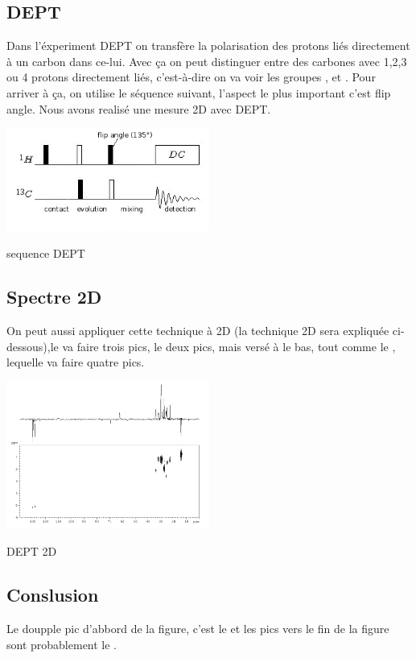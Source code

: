 \documentclass[a4paper,12pt]{scrartcl}
\begin{document}
  \subsection{DEPT }
Dans l'éxperiment DEPT on transfère la polarisation des protons liés directement à un carbon dans ce-lui. Avec \c ca on peut distinguer entre des carbones avec 1,2,3 ou 4 protons directement liés, c'est-à-dire on va voir les groupes ,  et . Pour arriver à \c ca, on utilise le séquence suivant, l'aspect le plus important c'est flip angle.  Nous avons realisé une mesure 2D avec DEPT.
\begin{figurehere}
    \center
    \includegraphics[width=0.5\textwidth]{bilder/DEPT.png}
    \caption{sequence DEPT}
   \end{figurehere}  


  \subsection{Spectre 2D}
   On peut aussi appliquer cette technique à 2D (la technique 2D sera expliquée ci-dessous),le  va faire trois pics, le   deux pics, mais versé à le bas, tout comme le , lequelle va faire quatre pics.
  \begin{figurehere}
    \center
    \includegraphics[width=0.5\textwidth]{bilder/dept_2d.png}
    \caption{DEPT 2D}
   \end{figurehere}

\subsection{Conslusion}
Le doupple pic d'abbord de la figure, c'est le  et les pics vers le fin de la figure sont probablement le  .
 
\end{document}
